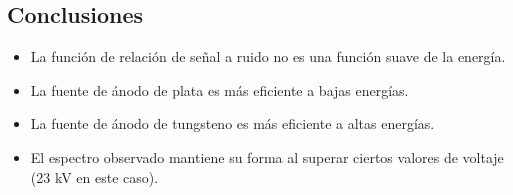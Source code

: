 \documentclass{sciposter}
\begin{document}
\begin{multicols}{3}
\section{Conclusiones}

\begin{itemize}
	\item La función de relación de señal a ruido no es una función suave de la energía.
	\item La fuente de ánodo de plata es más eficiente a bajas energías.
	\item La fuente de ánodo de tungsteno es más eficiente a altas energías.
	\item El espectro observado mantiene su forma al superar ciertos valores de voltaje (23 kV en este caso).
\end{itemize}
%	 
	
\nocite{als2011elements,amtek,ballabriga2011medipix3,exper,koningsberger1988x,manualT,mendenhall2017high,mini,param,range,van2014scikit,xps}

\small


\end{multicols}
\end{document}

